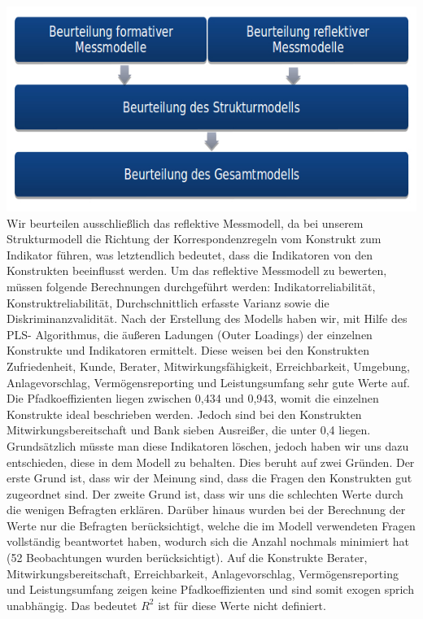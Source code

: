 \documentclass{article}\usepackage[]{graphicx}\usepackage[]{color}
\begin{document}
\includegraphics[width = 1\textwidth]{figure/beurteilung}
Wir beurteilen ausschließlich das reflektive Messmodell, da bei unserem Strukturmodell die Richtung der Korrespondenzregeln vom Konstrukt zum Indikator führen, was letztendlich bedeutet, dass die Indikatoren von den Konstrukten beeinflusst werden. Um das reflektive Messmodell zu bewerten, müssen folgende Berechnungen durchgeführt werden: Indikatorreliabilität, Konstruktreliabilität, Durchschnittlich erfasste Varianz sowie die Diskriminanzvalidität.
Nach der Erstellung des Modells haben wir, mit Hilfe des PLS- Algorithmus, die äußeren Ladungen (Outer Loadings) der einzelnen Konstrukte und Indikatoren ermittelt. Diese weisen bei den Konstrukten Zufriedenheit, Kunde, Berater, Mitwirkungsfähigkeit, Erreichbarkeit, Umgebung, Anlagevorschlag, Vermögensreporting und Leistungsumfang sehr gute Werte auf. Die Pfadkoeffizienten liegen zwischen 0,434 und 0,943, womit die einzelnen Konstrukte ideal beschrieben werden. Jedoch sind bei den Konstrukten Mitwirkungsbereitschaft und Bank sieben Ausreißer, die unter 0,4 liegen. Grundsätzlich müsste man diese Indikatoren löschen, jedoch haben wir uns dazu entschieden, diese in dem Modell zu behalten. Dies beruht auf zwei Gründen. Der erste Grund ist, dass wir der Meinung sind, dass die Fragen den Konstrukten gut zugeordnet sind. Der zweite Grund ist, dass wir uns die schlechten Werte durch die wenigen Befragten erklären. Darüber hinaus wurden bei der Berechnung der Werte nur die Befragten berücksichtigt, welche die im Modell verwendeten Fragen vollständig beantwortet haben, wodurch sich die Anzahl nochmals minimiert hat (52 Beobachtungen wurden berücksichtigt).  Auf die Konstrukte Berater, Mitwirkungsbereitschaft, Erreichbarkeit, Anlagevorschlag, Vermögensreporting und Leistungsumfang zeigen keine Pfadkoeffizienten und sind somit exogen sprich unabhängig. Das bedeutet $R^{2}$ ist für diese Werte nicht definiert. \\
\end{document}
